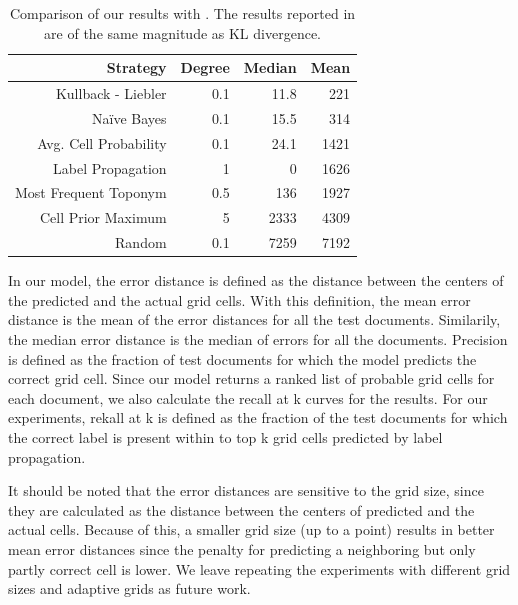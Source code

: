 \begin{table}[tbp]
\begin{center}
\begin{tabular}{|r|r|r|r|}
\hline
Strategy & Degree & Median & Mean \\
\hline
Kullback - Liebler & 0.1 & 11.8 & 221 \\
Naïve Bayes & 0.1 & 15.5 & 314 \\
Avg. Cell Probability & 0.1 & 24.1 & 1421 \\
Label Propagation & 1 & 0 &  1626 \\
Most Frequent Toponym &  0.5 &  136 & 1927 \\
Cell Prior Maximum & 5 & 2333 & 4309 \\
Random & 0.1 &7259 & 7192 \\
\hline
\end{tabular}
\caption{Comparison of our results with \cite{wing-baldridge:11}. The results reported in \cite{rolleretal:12} are of the same magnitude as KL divergence.}
\label{tab:comparison}
\end{center}
\end{table}


In our model, the error distance is defined as the distance between the
centers of the predicted and the actual grid cells.  With this
definition, the mean error distance is the mean of the error distances for all
the test documents. Similarily, the median error distance is the median of
errors for all the documents.  Precision is defined as the
fraction of test documents for which the model predicts the correct grid cell.
Since our model returns a ranked list of probable grid cells for each
document,  we also
calculate the recall at k curves for the results. For our experiments, rekall
at k is defined as the fraction of the test documents for which the correct
label is present within to top k grid cells predicted by label propagation.

It should be noted that the error distances are sensitive to the grid size,
since they are calculated as the distance between the centers of predicted and
the actual cells. Because of this, a smaller grid size (up to a point) results
in better mean error distances since the penalty for predicting a neighboring
but only partly correct cell is lower. We leave repeating the experiments with
different grid sizes and adaptive grids as future work.



